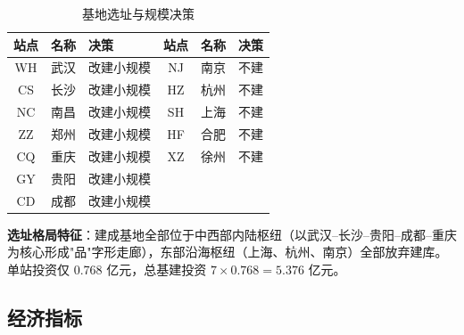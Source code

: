 \documentclass[12pt,a4paper,fontset=none]{ctexart}
\begin{document}
\begin{table}[H]
\centering
\caption{基地选址与规模决策}
\label{tab:location}
\begin{tabular}{cclccl}
\toprule
站点 & 名称 & 决策 & 站点 & 名称 & 决策 \\
\midrule
WH  & 武汉 & \cellcolor{green!15}改建小规模 & NJ  & 南京 & \cellcolor{red!10}不建 \\
CS  & 长沙 & \cellcolor{green!15}改建小规模 & HZ  & 杭州 & \cellcolor{red!10}不建 \\
NC  & 南昌 & \cellcolor{green!15}改建小规模 & SH  & 上海 & \cellcolor{red!10}不建 \\
ZZ  & 郑州 & \cellcolor{green!15}改建小规模 & HF  & 合肥 & \cellcolor{red!10}不建 \\
CQ  & 重庆 & \cellcolor{green!15}改建小规模 & XZ  & 徐州 & \cellcolor{red!10}不建 \\
GY  & 贵阳 & \cellcolor{green!15}改建小规模 &     &      &    \\
CD  & 成都 & \cellcolor{green!15}改建小规模 &     &      &    \\
\bottomrule
\end{tabular}
\end{table}

\textbf{选址格局特征}：建成基地全部位于中西部内陆枢纽（以武汉--长沙--贵阳--成都--重庆为核心形成"品"字形走廊），东部沿海枢纽（上海、杭州、南京）全部放弃建库。单站投资仅 0.768 亿元，总基建投资 $7 \times 0.768 = 5.376$ 亿元。

\subsection{经济指标}
\end{document}
